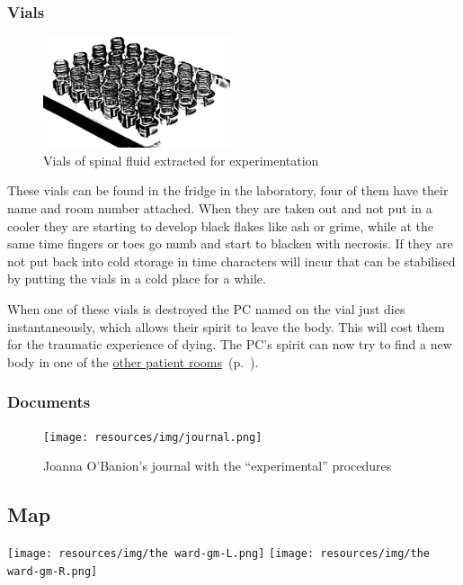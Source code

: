 \subsubsection{Vials}%
\label{ssub:vials}

\begin{figure}[!htbp]
  \centering
  \includegraphics[width=5.5cm, keepaspectratio]{resources/img/test tubes.png}
  \caption{Vials of spinal fluid extracted for experimentation}\label{vials}
\end{figure}
These vials can be found in the fridge in the laboratory, four of them have their name and room number attached.  When they are
taken out and not put in a cooler they are starting to develop black flakes like ash or grime, while at the same time fingers
or toes go numb and start to blacken with necrosis.  If they are not put back into cold storage in time characters will incur
 that can be stabilised by putting the vials in a cold place for a while.

When one of these vials is destroyed the PC named on the vial just dies instantaneously, which allows their spirit to leave the
body.  This will cost them  for the traumatic experience of dying.  The PC's spirit can now try to find a new
body in one of the \hyperref[ssub:other_patient_rooms]{other patient rooms}~(p.~\pageref{ssub:other_patient_rooms}).

\subsubsection{Documents}%
\label{ssub:documents}

\begin{figure}[!htbp]
  \centering
  \texttt{[image: resources/img/journal.png]}
  \caption{Joanna O'Banion's journal with the “experimental” procedures}\label{notebook}
\end{figure}

\clearpage
\onecolumn
\subsection{Map}%
\label{sub:map}
\hspace*{-0.5cm}%
\texttt{[image: resources/img/the ward-gm-L.png]}
\newpage
\vspace*{0.55cm}%
\hspace*{-2.0cm}%
\texttt{[image: resources/img/the ward-gm-R.png]}
\clearpage %

